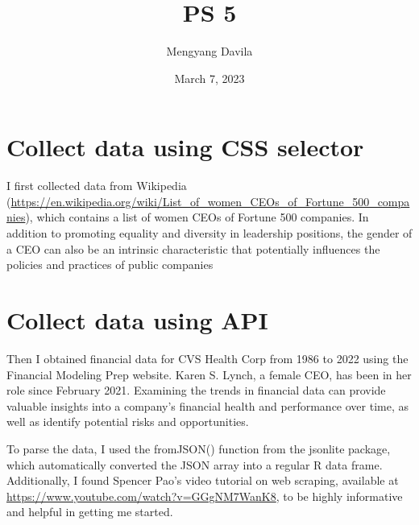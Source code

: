 \documentclass{article}
\title{PS 5}
\author{Mengyang Davila}
\date{March 7, 2023}
\begin{document}
\maketitle
\section*{Collect data using CSS selector}
I first collected data from Wikipedia (\url{https://en.wikipedia.org/wiki/List_of_women_CEOs_of_Fortune_500_companies}), which contains a list of women CEOs of Fortune 500 companies. In addition to promoting equality and diversity in leadership positions, the gender of a CEO can also be an intrinsic characteristic that potentially influences the policies and practices of public companies


\section*{Collect data using API}
Then I obtained financial data for CVS Health Corp from 1986 to 2022 using the Financial Modeling Prep website. Karen S. Lynch, a female CEO, has been in her role since February 2021. Examining the trends in financial data can provide valuable insights into a company's financial health and performance over time, as well as identify potential risks and opportunities. 

To parse the data, I used the fromJSON() function from the jsonlite package, which automatically converted the JSON array into a regular R data frame. Additionally, I found Spencer Pao's video tutorial on web scraping, available at \url{https://www.youtube.com/watch?v=GGgNM7WanK8}, to be highly informative and helpful in getting me started.
\end{document}
